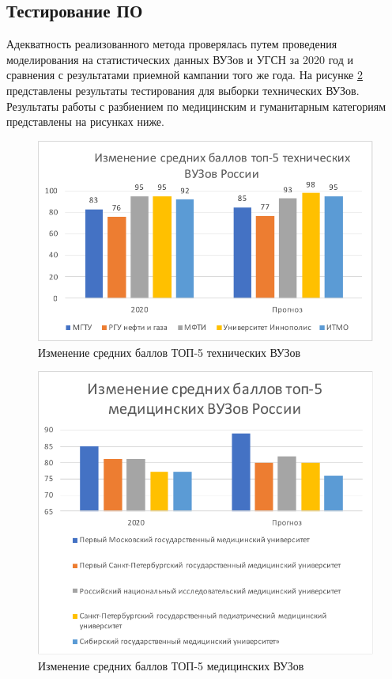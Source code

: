 \subsection{Тестирование ПО}

Адекватность реализованного метода проверялась путем проведения моделирования на статистических данных ВУЗов и УГСН за 2020 год и сравнения с результатами приемной кампании того же года. На рисунке \ref{top5tech} представлены результаты тестирования для выборки технических ВУЗов. Результаты работы с разбиением по медицинским и гуманитарным категориям представлены на рисунках ниже.

\begin{figure}[hbtp]
	\centering
	\includegraphics[scale=1.1]{img/top5tech.pdf.pdf}
	\caption{Изменение средних баллов ТОП-5 технических ВУЗов}
	\label{top5tech}
\end{figure} 

\begin{figure}[hbtp]
	\centering
	\includegraphics[scale=1.1]{img/top5med.pdf.pdf}
	\caption{Изменение средних баллов ТОП-5 медицинских ВУЗов}
	\label{top5tech}
\end{figure} 

